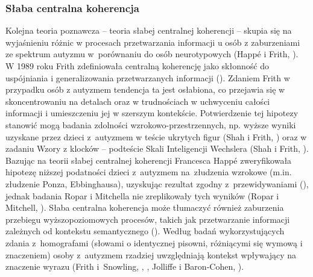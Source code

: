     \subsubsection{Słaba centralna koherencja}
    \label{subsubsection:teoriakoherencji}
    Kolejna teoria poznawcza -- teoria słabej centralnej koherencji -- skupia się na wyjaśnieniu różnic w procesach przetwarzania informacji u osób z zaburzeniami ze spektrum autyzmu w~porównaniu do osób neurotypowych (Happ{\'e} i Frith, \cite*{happe2006weak}).
    W 1989 roku Frith zdefiniowała centralną koherencję jako skłonność do uspójniania i generalizowania przetwarzanych informacji (\cite{frith2008autyzm}).
    Zdaniem Frith w przypadku osób z autyzmem tendencja ta jest osłabiona, co przejawia się w skoncentrowaniu na detalach oraz w trudnościach w uchwyceniu całości informacji i umieszczeniu jej w szerszym kontekście.
    Potwierdzenie tej hipotezy stanowić mogą badania zdolności wzrokowo-przestrzennych, np. wyższe wyniki uzyskane przez dzieci z~autyzmem w teście ukrytych figur (Shah i Frith, \cite*{shah1983islet}) oraz w zadaniu Wzory z klocków -- podteście Skali Inteligencji Wechslera (Shah i Frith, \cite*{shah1993autistic}).
    Bazując na teorii słabej centralnej koherencji Francesca Happ{\'e} zweryfikowała hipotezę niższej podatności dzieci z~autyzmem na~złudzenia wzrokowe (m.in. złudzenie Ponza, Ebbinghausa), uzyskując rezultat zgodny z~przewidywaniami (\cite{happe1996studying}), jednak badania Ropar i Mitchella nie zreplikowały tych wyników (Ropar i Mitchell, \cite*{ropar1999individuals}).
    Słaba centralna koherencja może tłumaczyć również zaburzenia przebiegu wyższopoziomowych procesów, takich jak przetwarzanie informacji zależnych od kontekstu semantycznego (\cite{frith2008autyzm}).
    Według badań wykorzystujących zdania z~homografami (słowami o identycznej pisowni, różniącymi się wymową i znaczeniem) osoby z~autyzmem rzadziej uwzględniają kontekst wpływający na znaczenie wyrazu (Frith i~Snowling, \cite*{frith1983reading}, \cite{happe1997central}, Jolliffe i Baron-Cohen, \cite*{jolliffe1999test}).  
    
